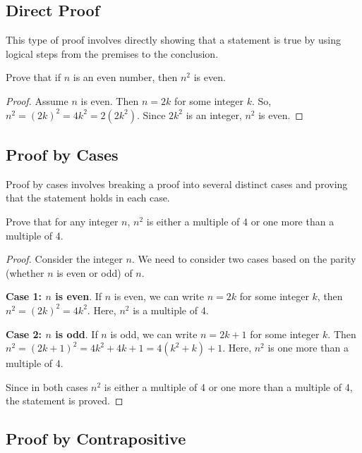 \documentclass{article}
\theoremstyle{mytheoremstyle}
\theoremstyle{mytheoremstyle}
\theoremstyle{myexamplestyle}
\begin{document}
\subsection{Direct Proof}

This type of proof involves directly showing that a statement is
true by using logical steps from the premises to the conclusion.

\begin{example}
    Prove that if \( n \) is an even number, then \( n^2 \) is even.
    \begin{proof}
        Assume \( n \) is even. Then \( n = 2k \) for some integer \( k \). So, \( n^2 = (2k)^2 = 4k^2 = 2(2k^2) \). Since \( 2k^2 \) is an integer, \( n^2 \) is even.
    \end{proof}
\end{example}


\subsection{Proof by Cases}

Proof by cases involves breaking a proof into several distinct cases and proving that the statement holds in each case.


\begin{example}
    Prove that for any integer \( n \), \( n^2 \) is either a multiple of 4 or one more than a multiple of 4.

    \begin{proof}
        Consider the integer \( n \). We need to consider two cases based on the parity (whether \( n \) is even or odd) of \( n \).

        \textbf{Case 1: \( n \) is even}.
        If \( n \) is even, we can write \( n = 2k \) for some
        integer \( k \), then \( n^2 = (2k)^2 = 4k^2 \). Here,
        \( n^2 \) is a multiple of 4.

        \textbf{Case 2: \( n \) is odd}.
        If \( n \) is odd, we can write \( n = 2k + 1 \) for some integer \( k \). Then
        \( n^2 = (2k + 1)^2 = 4k^2 + 4k + 1 = 4(k^2 + k) + 1 \).
        Here, \( n^2 \) is one more than a multiple of 4.

        Since in both cases \( n^2 \) is either a multiple of 4 or one more than a multiple of 4, the statement is proved.
    \end{proof}
\end{example}

\newpage

\subsection{Proof by Contrapositive}
\end{document}
